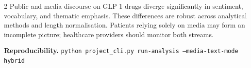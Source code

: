 \documentclass[10pt,a4paper]{article}
\begin{document}
\begin{multicols}{2}
Public and media discourse on GLP-1 drugs diverge significantly in sentiment, vocabulary, and thematic emphasis.  These differences are robust across analytical methods and length normalisation.  Patients relying solely on media may form an incomplete picture; healthcare providers should monitor both streams.

\vspace{4pt}
{\footnotesize\textbf{Reproducibility.} \texttt{python project\_cli.py run-analysis --media-text-mode hybrid}}

\end{multicols}
\end{document}
